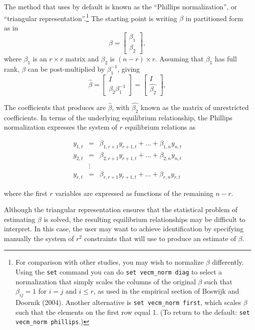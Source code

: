 The method that  uses by default is known as the ``Phillips
normalization'', or ``triangular representation''.\footnote{For
  comparison with other studies, you may wish to normalize $\beta$
  differently.  Using the \texttt{set} command you can do 
  \verb|set vecm_norm diag| to select a normalization that simply scales the
  columns of the original $\beta$ such that $\beta_{ij} = 1$ for $i=j$
  and $i \leq r$, as used in the empirical section of Boswijk and
  Doornik (2004).  Another alternative is \verb+set vecm_norm first+,
  which scales $\beta$ such that the elements on the first row equal
  1.  (To return to the default: \texttt{set vecm\_norm phillips}.)
} The starting point is writing $\beta$ in partitioned form as in
\[
  \beta = \left[
    \begin{array}{c} \beta_1 \\ \beta_2  \end{array}
    \right] ,
\]
where $\beta_1$ is an $r \times r$ matrix and  $\beta_2$ is $(n-r)
\times r$. Assuming that $\beta_1$ has full rank, $\beta$ can be
post-multiplied by $\beta_1^{-1}$, giving
\[
  \hat{\beta} = \left[
    \begin{array}{c} I \\ \beta_2 \beta_1^{-1}  \end{array}
    \right] =
    \left[
    \begin{array}{c} I \\ \hat{\beta_2} \end{array}
  \right]  ,
\]

The coefficients that  produces are $\hat{\beta}$, with
$\hat{\beta_2}$ known as the matrix of unrestricted coefficients. In
terms of the underlying equilibrium relationship, the Phillips
normalization expresses the system of $r$ equilibrium relations as

  \begin{eqnarray}
    y_{1,t} & = & \beta_{1,r+1} y_{r+1,t} + \ldots + \beta_{1,n} y_{n,t} \\
    y_{2,t} & = & \beta_{2,r+1} y_{r+1,t} + \ldots + \beta_{2,n} y_{n,t} \\
    & \vdots & \\
    y_{r,t} & = & \beta_{r,r+1} y_{r+1,t} + \ldots + \beta_{r,n} y_{r,t} 
  \end{eqnarray}

where the first $r$ variables are expressed as functions of the
remaining $n-r$.

Although the triangular representation ensures that the statistical problem of
estimating $\beta$ is solved, the resulting equilibrium relationships
may be difficult to interpret. In this case, the user may want to
achieve identification by specifying manually the system of $r^2$
constraints that  will use to produce an estimate of
$\beta$.

